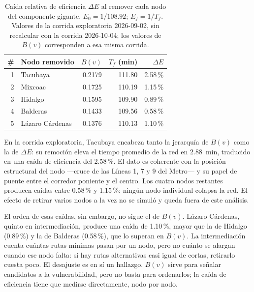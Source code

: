 \begin{table}[H]
    \centering
    \caption[Impacto de remoción de nodos críticos --- $\Delta E$ exploratorio]{%
    Caída relativa de eficiencia $\Delta E$ al remover cada nodo del
    componente gigante. $E_0 = 1/108.92$; $E_f = 1/T_f$. Valores de la
    corrida exploratoria 2026-09-02, sin recalcular con la corrida
    2026-10-04; los valores de $B(v)$ corresponden a esa misma corrida.}
    \label{tab:delta-e-top5}
    \small
    \begin{tabular}{|r|l|r|r|r|}
        \hline
        \textbf{\#} & \textbf{Nodo removido} &
        \textbf{$B(v)$} & \textbf{$T_f$ (min)} & \textbf{$\Delta E$} \\
        \hline
        1 & Tacubaya        & 0.2179 & 111.80 & 2.58\,\% \\
        2 & Mixcoac         & 0.1725 & 110.19 & 1.15\,\% \\
        3 & Hidalgo         & 0.1595 & 109.90 & 0.89\,\% \\
        4 & Balderas        & 0.1433 & 109.56 & 0.58\,\% \\
        5 & Lázaro Cárdenas & 0.1376 & 110.13 & 1.10\,\% \\
        \hline
    \end{tabular}
\end{table}

En la corrida exploratoria, Tacubaya encabeza tanto la jerarquía de $B(v)$ como la
de $\Delta E$: su remoción eleva el tiempo promedio de la red en 2.88~min,
traducido en una caída de eficiencia del 2.58\,\%. El dato es coherente con la
posición estructural del nodo ---cruce de las Líneas 1, 7 y 9 del Metro--- y su
papel de puente entre el corredor poniente y el centro. Los cuatro nodos
restantes producen caídas entre 0.58\,\% y 1.15\,\%: ningún nodo individual
colapsa la red. El efecto de retirar varios nodos a la vez no se simuló y queda
fuera de este análisis.

El orden de esas caídas, sin embargo, no sigue el de $B(v)$. Lázaro Cárdenas,
quinto en intermediación, produce una caída de 1.10\,\%, mayor que la de Hidalgo
(0.89\,\%) y la de Balderas (0.58\,\%), que lo superan en $B(v)$. La
intermediación cuenta cuántas rutas mínimas pasan por un nodo, pero no cuánto se
alargan cuando ese nodo falta: si hay rutas alternativas casi igual de cortas,
retirarlo cuesta poco. El desajuste es en sí un hallazgo. $B(v)$ sirve para
señalar candidatos a la vulnerabilidad, pero no basta para ordenarlos; la caída
de eficiencia tiene que medirse directamente, nodo por nodo.

